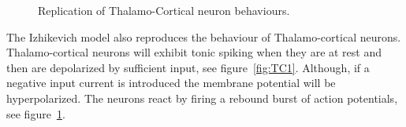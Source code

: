 \documentclass[12pt]{scrreprt}
\begin{document}
\begin{figure}[H]
\centering
\begin{minipage}{.45\textwidth}
\label{fig:TC1}
\end{minipage}
\begin{minipage}{.45\textwidth}
\label{fig:TC2}
\end{minipage}
\caption{Replication of Thalamo-Cortical neuron behaviours.}
\end{figure}
The Izhikevich model also reproduces the behaviour of Thalamo-cortical neurons.
Thalamo-cortical neurons will exhibit tonic spiking when they are at rest and then are depolarized by sufficient input, see figure~\ref{fig:TC1}. 
Although, if a negative input current is introduced the membrane potential will be hyperpolarized. 
The neurons react by firing a rebound burst of action potentials, see figure~\ref{fig:TC2}. 
\end{document}

